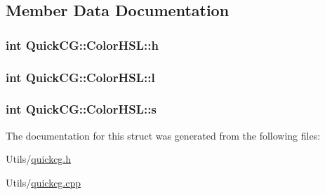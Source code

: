 \subsection{Member Data Documentation}
\hypertarget{structQuickCG_1_1ColorHSL_a22460cd9b83f6cfc658dfd4c6acb9dc1}{
\subsubsection[{h}]{\setlength{\rightskip}{0pt plus 5cm}int Quick\-C\-G\-::\-Color\-H\-S\-L\-::h}}\label{structQuickCG_1_1ColorHSL_a22460cd9b83f6cfc658dfd4c6acb9dc1}
\hypertarget{structQuickCG_1_1ColorHSL_ab67c594a335b19305eee199fb64a5d61}{
\subsubsection[{l}]{\setlength{\rightskip}{0pt plus 5cm}int Quick\-C\-G\-::\-Color\-H\-S\-L\-::l}}\label{structQuickCG_1_1ColorHSL_ab67c594a335b19305eee199fb64a5d61}
\hypertarget{structQuickCG_1_1ColorHSL_abf20406550a927b4afe96ddec60de577}{
\subsubsection[{s}]{\setlength{\rightskip}{0pt plus 5cm}int Quick\-C\-G\-::\-Color\-H\-S\-L\-::s}}\label{structQuickCG_1_1ColorHSL_abf20406550a927b4afe96ddec60de577}


The documentation for this struct was generated from the following files\-:\begin{DoxyCompactItemize}
\item 
Utils/\hyperlink{quickcg_8h}{quickcg.\-h}\item 
Utils/\hyperlink{quickcg_8cpp}{quickcg.\-cpp}\end{DoxyCompactItemize}
